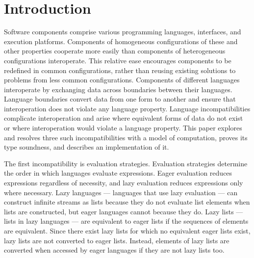\chapter{Introduction}

Software components comprise various programming languages, interfaces, and execution platforms.  Components of homogeneous configurations of these and other properties cooperate more easily than components of heterogeneous configurations interoperate.  This relative ease encourages components to be redefined in common configurations, rather than reusing existing solutions to problems from less common configurations.  Components of different languages interoperate by exchanging data across boundaries between their languages.  Language boundaries convert data from one form to another and ensure that interoperation does not violate any language property.  Language incompatibilities complicate interoperation and arise where equivalent forms of data do not exist or where interoperation would violate a language property.  This paper explores and resolves three such incompatibilities with a model of computation, proves its type soundness, and describes an implementation of it.

The first incompatibility is evaluation strategies.  Evaluation strategies determine the order in which languages evaluate expressions.  Eager evaluation reduces expressions regardless of necessity, and lazy evaluation reduces expressions only where necessary.  Lazy languages --- languages that use lazy evaluation --- can construct infinite streams as lists because they do not evaluate list elements when lists are constructed, but eager languages cannot because they do.  Lazy lists --- lists in lazy languages --- are equivalent to eager lists if the sequences of elements are equivalent.  Since there exist lazy lists for which no equivalent eager lists exist, lazy lists are not converted to eager lists.  Instead, elements of lazy lists are converted when accessed by eager languages if they are not lazy lists too.

